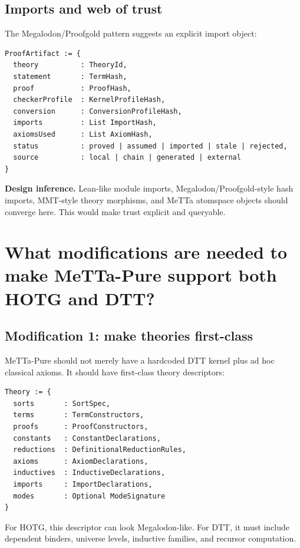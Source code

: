 \documentclass[11pt]{article}
\newcommand{\MeTTa}{\textup{MeTTa}}
\newcommand{\Megalodon}{\textup{Megalodon}}
\newcommand{\HOTG}{\textup{HOTG}}
\newcommand{\DTT}{\textup{DTT}}
\newcommand{\Infer}{\textbf{Design inference.}}
\begin{document}
\subsection{Imports and web of trust}

The \Megalodon{}/Proofgold pattern suggests an explicit import object:

\begin{lstlisting}[caption={Sketch: proof provenance object}]
ProofArtifact := {
  theory          : TheoryId,
  statement       : TermHash,
  proof           : ProofHash,
  checkerProfile  : KernelProfileHash,
  conversion      : ConversionProfileHash,
  imports         : List ImportHash,
  axiomsUsed      : List AxiomHash,
  status          : proved | assumed | imported | stale | rejected,
  source          : local | chain | generated | external
}
\end{lstlisting}

\Infer{} Lean-like module imports, Megalodon/Proofgold-style hash imports, MMT-style theory morphisms, and \MeTTa{} atomspace objects should converge here.  This would make trust explicit and queryable.

\section{What modifications are needed to make MeTTa-Pure support both HOTG and DTT?}

\subsection{Modification 1: make theories first-class}

\MeTTa-Pure should not merely have a hardcoded DTT kernel plus ad hoc classical axioms.  It should have first-class theory descriptors:

\begin{lstlisting}[caption={Sketch: theory descriptor}]
Theory := {
  sorts       : SortSpec,
  terms       : TermConstructors,
  proofs      : ProofConstructors,
  constants   : ConstantDeclarations,
  reductions  : DefinitionalReductionRules,
  axioms      : AxiomDeclarations,
  inductives  : InductiveDeclarations,
  imports     : ImportDeclarations,
  modes       : Optional ModeSignature
}
\end{lstlisting}

For \HOTG{}, this descriptor can look \Megalodon{}-like.  For \DTT{}, it must include dependent binders, universe levels, inductive families, and recursor computation.
\end{document}

